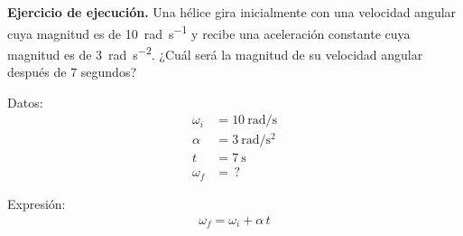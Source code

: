 \documentclass[12pt, letter]{exam}
\begin{document}
\begin{questions}

    \setcounter{question}{12} \question \label{Ejercicio_09} \textbf{Ejercicio de ejecución. } Una hélice gira inicialmente con una velocidad angular cuya magnitud es de \SI{10}{\radian\per\second} y recibe una aceleración constante cuya magnitud es de \SI{3}{\radian\per\square\second}. ¿Cuál será la magnitud de su velocidad angular después de \num{7} segundos?

    \begin{minipage}[t]{0.35\linewidth}
    Datos: 
    \begin{align*}
    \omega_{i} &= \SI{10}{\radian\per\second} \\
    \alpha &= \SI{3}{\radian\per\square\second} \\
    t &= \SI{7}{\second} \\
    \omega_{f} &= \, ?
    \end{align*}
    \end{minipage}
    \hspace{1cm}
    \begin{minipage}[t]{0.4\linewidth}
    Expresión:
    \begin{align*}
    \omega_{f} = \omega_{i} + \alpha \, t
    \end{align*}
    \end{minipage}


\end{questions}
\end{document}
